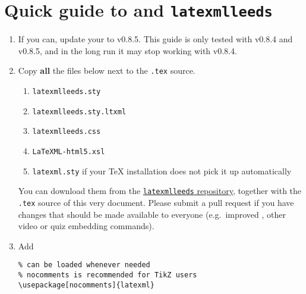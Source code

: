 \documentclass[a4paper]{article}
\theoremstyle{definition}
\begin{document}
\section{Quick guide to \texorpdfstring{\LaTeXML{}}{LaTeXML} and \texttt{latexmlleeds}}
\begin{enumerate}
  \item If you can, update your \LaTeXML{} to v0.8.5. This guide is only tested with v0.8.4 and v0.8.5, and in the long run it may stop working with v0.8.4.
  \item Copy \textbf{all} the files below next to the \verb|.tex| source.
  \begin{enumerate}
    \item \verb|latexmlleeds.sty|
    \item \verb|latexmlleeds.sty.ltxml|
    \item \verb|latexmlleeds.css|
    \item \verb|LaTeXML-html5.xsl|
    \item \verb|latexml.sty| if your \TeX{} installation does not pick it up automatically
  \end{enumerate}
  You can download them from the \href{https://dev.azure.com/pmtvlm-leeds-ac-uk/public/_git/latexmlleeds}{\texttt{latexmlleeds} repository}, together with the \verb|.tex| source of this very document. Please submit a pull request if you have changes that should be made available to everyone (e.g.\ improved \CSS{}, other video or quiz embedding commands).
  \item Add
  \begin{lstlisting}[style=latexml]
% for \iflatexml and other goodies
% can be loaded whenever needed
% nocomments is recommended for TikZ users
\usepackage[nocomments]{latexml}


\end{lstlisting}
\end{enumerate}
\end{document}
